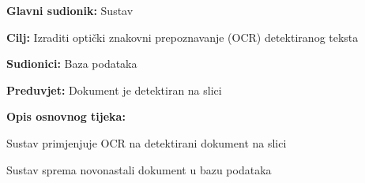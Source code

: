 					
					\noindent {}
					\begin{packed_item}
						
						\item \textbf{Glavni sudionik: } Sustav
						\item \textbf{Cilj:} Izraditi optički znakovni prepoznavanje (OCR) detektiranog teksta
						\item \textbf{Sudionici:} Baza podataka
						\item \textbf{Preduvjet:} Dokument je detektiran na slici
						\item \textbf{Opis osnovnog tijeka:}
						
						\item[] \begin{packed_enum}
							
							\item Sustav primjenjuje OCR na detektirani dokument na slici
							\item Sustav sprema novonastali dokument u bazu podataka
							
						\end{packed_enum}
					\end{packed_item}
					
					\clearpage
					
